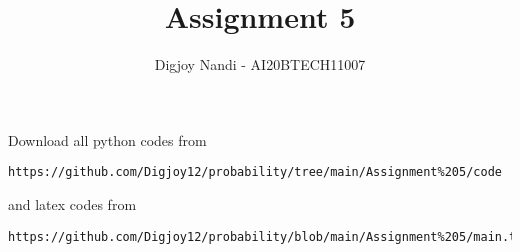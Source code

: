 \documentclass[journal,12pt,twocolumn]{IEEEtran}
\DeclareMathOperator*{\Res}{Res}
\begin{document}
\newcommand{\BEQA}{\begin{eqnarray}}
\newcommand{\EEQA}{\end{eqnarray}}
\newcommand{\define}{\stackrel{\triangle}{=}}

\raggedbottom
\setlength{\parindent}{0pt}
\providecommand{\mbf}{\mathbf}
\providecommand{\pr}[1]{\ensuremath{\Pr\left(#1\right)}}
\providecommand{\qfunc}[1]{\ensuremath{Q\left(#1\right)}}
\providecommand{\sbrak}[1]{\ensuremath{{}\left[#1\right]}}
\providecommand{\lsbrak}[1]{\ensuremath{{}\left[#1\right.}}
\providecommand{\rsbrak}[1]{\ensuremath{{}\left.#1\right]}}
\providecommand{\brak}[1]{\ensuremath{\left(#1\right)}}
\providecommand{\lbrak}[1]{\ensuremath{\left(#1\right.}}
\providecommand{\rbrak}[1]{\ensuremath{\left.#1\right)}}
\providecommand{\cbrak}[1]{\ensuremath{\left\{#1\right\}}}
\providecommand{\lcbrak}[1]{\ensuremath{\left\{#1\right.}}
\providecommand{\rcbrak}[1]{\ensuremath{\left.#1\right\}}}
\theoremstyle{remark}
\newtheorem{rem}{Remark}
\newcommand{\sgn}{\mathop{\mathrm{sgn}}}
\providecommand{\abs}[1]{\vert#1\vert}
\providecommand{\res}[1]{\Res\displaylimits_{#1}} 
\providecommand{\norm}[1]{\lVert#1\rVert}
\providecommand{\mtx}[1]{\mathbf{#1}}
\providecommand{\mean}[1]{E[ #1 ]}
\providecommand{\fourier}{\overset{\mathcal{F}}{ \rightleftharpoons}}
\providecommand{\system}{\overset{\mathcal{H}}{ \longleftrightarrow}}
\newcommand{\solution}{\noindent \textbf{Solution: }}
\newcommand{\cosec}{\,\text{cosec}\,}
\providecommand{\dec}[2]{\ensuremath{\overset{#1}{\underset{#2}{\gtrless}}}}
\newcommand{\myvec}[1]{\ensuremath{\begin{pmatrix}#1\end{pmatrix}}}
\newcommand{\mydet}[1]{\ensuremath{\begin{vmatrix}#1\end{vmatrix}}}
\makeatletter
{}
\makeatother
\let\StandardTheFigure\thefigure
\let\vec\mathbf
\renewcommand{\thefigure}{\theproblem}
\def\putbox#1#2#3{\makebox[0in][l]{\makebox[#1][l]{}\raisebox{\baselineskip}[0in][0in]{\raisebox{#2}[0in][0in]{#3}}}}
     \def\rightbox#1{\makebox[0in][r]{#1}}
     \def\centbox#1{\makebox[0in]{#1}}
     \def\topbox#1{\raisebox{-\baselineskip}[0in][0in]{#1}}
     \def\midbox#1{\raisebox{-0.5\baselineskip}[0in][0in]{#1}}
\vspace{3cm}
\title{Assignment 5}
\author{Digjoy Nandi - AI20BTECH11007}
\maketitle
\newpage
\bigskip
\renewcommand{\thefigure}{\theenumi}
\renewcommand{\thetable}{\theenumi}
Download all python codes from 
\begin{lstlisting}
https://github.com/Digjoy12/probability/tree/main/Assignment%205/code
\end{lstlisting}
%
and latex codes from 
%
\begin{lstlisting}
https://github.com/Digjoy12/probability/blob/main/Assignment%205/main.tex
\end{lstlisting}
\end{document}
